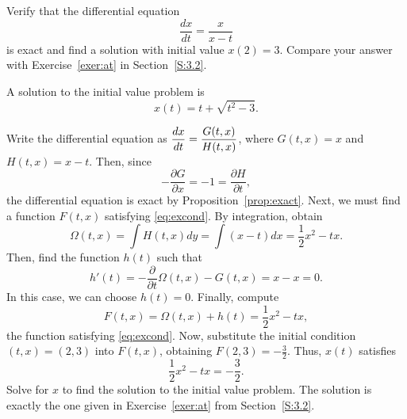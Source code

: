 \documentclass{ximera}
\begin{document}
\begin{exercise} \label{c14.6.6}
Verify that the differential equation 
\[
\frac{dx}{dt} = \frac{x}{x-t}
\]
is exact and find a solution with initial value $x(2)=3$.   Compare your 
answer with Exercise~\ref{exer:at} in Section~\ref{S:3.2}.

\begin{solution}
\ans A solution to the initial value problem is
\[
x(t) = t + \sqrt{t^2-3}.
\]

\soln Write the differential equation as $\displaystyle\frac{dx}{dt} =
\frac{G(t,x)}{H(t,x)}$, where $G(t,x) = x$ and $H(t,x) = x - t$.  Then,
since
\[
-\frac{\partial G}{\partial x} = -1 = \frac{\partial H}{\partial t},
\]
the differential equation is exact by Proposition~\ref{prop:exact}.  Next,
we must find a function $F(t,x)$ satisfying \eqref{eq:excond}.  By integration,
obtain
\[
\Omega(t,x) = \int H(t,x)dy = \int (x - t)dx = \frac{1}{2}x^2 -tx.
\]
Then, find the function $h(t)$ such that
\[
h'(t) = -\frac{\partial}{\partial t}\Omega(t,x) - G(t,x)
= x - x = 0 .
\]
In this case, we can choose $h(t) = 0$.  Finally, compute
\[
F(t,x) = \Omega(t,x) + h(t) =  \frac{1}{2}x^2 -tx,
\]
the function satisfying \eqref{eq:excond}.  Now, substitute the initial
condition $(t,x) = (2,3)$ into $F(t,x)$, obtaining $F(2,3) = -\frac{3}{2}$.  Thus,
$x(t)$ satisfies
\[
 \frac{1}{2}x^2 -tx = -\frac{3}{2}.
\]
Solve for $x$ to find the solution to the initial value problem.  The
solution is exactly the one given in Exercise~\ref{exer:at} from
Section~\ref{S:3.2}.


\end{solution}
\end{exercise} 
\end{document}

